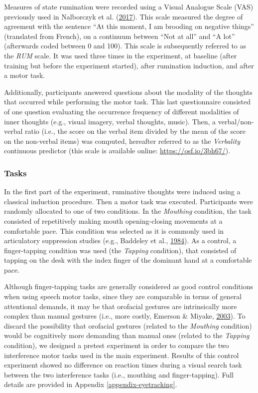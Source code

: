 \documentclass[a4paper,12pt,twoside,openright,oldfontcommands,final]{memoir}
\begin{document}
Measures of state rumination were recorded using a Visual Analogue Scale (VAS) previously used in Nalborczyk et al. (\protect\hyperlink{ref-nalborczyk_orofacial_2017}{2017}). This scale measured the degree of agreement with the sentence \enquote{At this moment, I am brooding on negative things} (translated from French), on a continuum between \enquote{Not at all} and \enquote{A lot} (afterwards coded between 0 and 100). This scale is subsequently referred to as the \emph{RUM} scale. It was used three times in the experiment, at baseline (after training but before the experiment started), after rumination induction, and after a motor task.

Additionally, participants answered questions about the modality of the thoughts that occurred while performing the motor task. This last questionnaire consisted of one question evaluating the occurrence frequency of different modalities of inner thoughts (e.g., visual imagery, verbal thoughts, music). Then, a verbal/non-verbal ratio (i.e., the score on the verbal item divided by the mean of the score on the non-verbal items) was computed, hereafter referred to as the \emph{Verbality} continuous predictor (this scale is available online: \url{https://osf.io/3bh67/}).

\hypertarget{tasks}{%
\subsubsection{Tasks}\label{tasks}}

In the first part of the experiment, ruminative thoughts were induced using a classical induction procedure. Then a motor task was executed. Participants were randomly allocated to one of two conditions. In the \emph{Mouthing} condition, the task consisted of repetitively making mouth opening-closing movements at a comfortable pace. This condition was selected as it is commonly used in articulatory suppression studies (e.g., Baddeley et al., \protect\hyperlink{ref-baddeley_exploring_1984}{1984}). As a control, a finger-tapping condition was used (the \emph{Tapping} condition), that consisted of tapping on the desk with the index finger of the dominant hand at a comfortable pace.

Although finger-tapping tasks are generally considered as good control conditions when using speech motor tasks, since they are comparable in terms of general attentional demands, it may be that orofacial gestures are intrinsically more complex than manual gestures (i.e., more costly, Emerson \& Miyake, \protect\hyperlink{ref-emerson_role_2003}{2003}). To discard the possibility that orofacial gestures (related to the \emph{Mouthing} condition) would be cognitively more demanding than manual ones (related to the \emph{Tapping} condition), we designed a pretest experiment in order to compare the two interference motor tasks used in the main experiment. Results of this control experiment showed no difference on reaction times during a visual search task between the two interference tasks (i.e., mouthing and finger-tapping). Full details are provided in Appendix \ref{appendix-eyetracking}.
\end{document}
